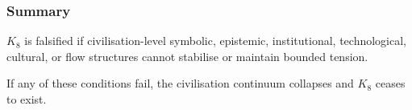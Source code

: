 \subsubsection{Summary}

$K_8$ is falsified if civilisation-level symbolic, epistemic,
institutional, technological, cultural, or flow structures
cannot stabilise or maintain bounded tension.

If any of these conditions fail,
the civilisation continuum collapses and $K_8$ ceases to exist.

